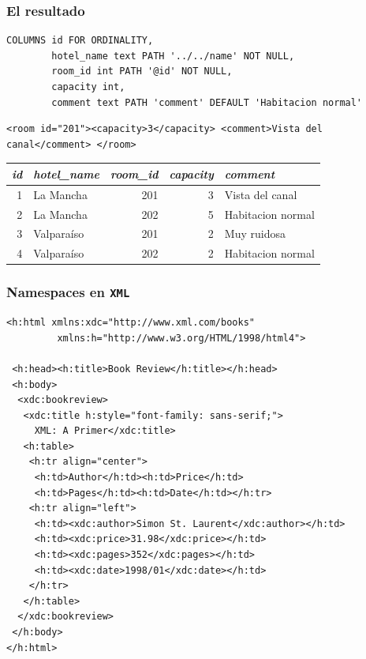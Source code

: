 \begin{frame}[fragile]

	\frametitle{El resultado}
\footnotesize
\begin{lstlisting}
COLUMNS id FOR ORDINALITY,
        hotel_name text PATH '../../name' NOT NULL,
        room_id int PATH '@id' NOT NULL,
        capacity int,
        comment text PATH 'comment' DEFAULT 'Habitacion normal'
\end{lstlisting}

\lstset{language=XML}
\begin{lstlisting}
<room id="201"><capacity>3</capacity> <comment>Vista del canal</comment> </room>
\end{lstlisting}

\normalsize
\vspace{1cm}
\begin{tabular}{r | l | r | r | l}
\textit{id} & \textit{hotel\_name} & \textit{room\_id} & \textit{capacity} & \textit{comment} \\
\hline
1 & La Mancha & 201 & 3 & Vista del canal \\
2 & La Mancha & 202 & 5 & Habitacion normal \\
3 & Valparaíso & 201 & 2 & Muy ruidosa \\
4 & Valparaíso & 202 & 2 & Habitacion normal \\
\end{tabular}

\end{frame}

\begin{frame}[fragile]
	\frametitle{Namespaces en \texttt{XML}}
	\footnotesize
	\lstset{language=XML}
	\begin{lstlisting}
<h:html xmlns:xdc="http://www.xml.com/books"
         xmlns:h="http://www.w3.org/HTML/1998/html4">

 <h:head><h:title>Book Review</h:title></h:head>
 <h:body>
  <xdc:bookreview>
   <xdc:title h:style="font-family: sans-serif;">
     XML: A Primer</xdc:title>
   <h:table>
    <h:tr align="center">
     <h:td>Author</h:td><h:td>Price</h:td>
     <h:td>Pages</h:td><h:td>Date</h:td></h:tr>
    <h:tr align="left">
     <h:td><xdc:author>Simon St. Laurent</xdc:author></h:td>
     <h:td><xdc:price>31.98</xdc:price></h:td>
     <h:td><xdc:pages>352</xdc:pages></h:td>
     <h:td><xdc:date>1998/01</xdc:date></h:td>
    </h:tr>
   </h:table>
  </xdc:bookreview>
 </h:body>
</h:html>
\end{lstlisting}
\end{frame}

